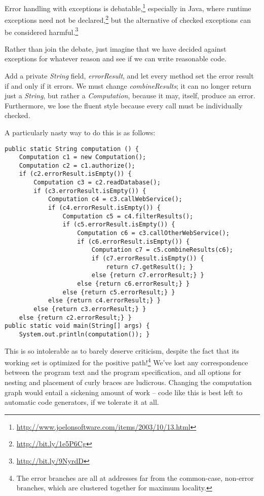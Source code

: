 \documentclass[11pt]{article}
\begin{document}
Error handling with exceptions is
debatable,\footnote{\url{http://www.joelonsoftware.com/items/2003/10/13.html}}
especially in Java, where runtime exceptions need not be
declared,\footnote{\url{http://bit.ly/1e5P6Cg}} but the alternative of checked
exceptions can be considered harmful.\footnote{\url{http://bit.ly/9NyrdD}}

Rather than join the debate, just imagine that we have decided
against exceptions for whatever reason and see if we can write
reasonable code.

Add a private \emph{String} field, \emph{errorResult}, and let every method
set the error result if and only if it errors. We must change
\emph{combineResults}; it can no longer return just a \emph{String}, but
rather a \emph{Computation}, because it may, itself, produce an error.
Furthermore, we lose the fluent style because every call must be
individually checked.

A particularly nasty way to do this is as follows:

\begin{verbatim}
public static String computation () {
    Computation c1 = new Computation();
    Computation c2 = c1.authorize();
    if (c2.errorResult.isEmpty()) {
        Computation c3 = c2.readDatabase();
        if (c3.errorResult.isEmpty()) {
            Computation c4 = c3.callWebService();
            if (c4.errorResult.isEmpty()) {
                Computation c5 = c4.filterResults();
                if (c5.errorResult.isEmpty()) {
                    Computation c6 = c3.callOtherWebService();
                    if (c6.errorResult.isEmpty()) {
                        Computation c7 = c5.combineResults(c6);
                        if (c7.errorResult.isEmpty()) {
                            return c7.getResult(); }
                        else {return c7.errorResult;} }
                    else {return c6.errorResult;} }
                else {return c5.errorResult;} }
            else {return c4.errorResult;} }
        else {return c3.errorResult;} }
    else {return c2.errorResult;} }
public static void main(String[] args) {
    System.out.println(computation()); }
\end{verbatim}

This is so intolerable as to barely deserve criticism, despite the
fact that its working set is optimized for the positive
path!\footnote{The error branches are all at addresses far from the
   common-case, non-error branches, which are clustered together for
   maximum locality.} We've lost any correspondence between the
program text and the program specification, and all options for
nesting and placement of curly braces are ludicrous. Changing the
computation graph would entail a sickening amount of work -- code
like this is best left to automatic code generators, if we
tolerate it at all.
\end{document}
